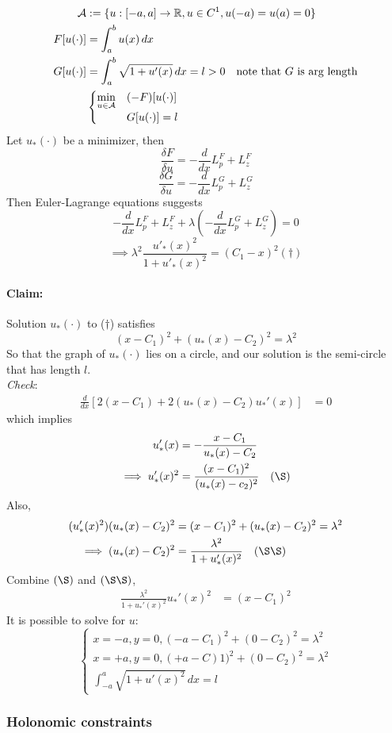 \documentclass[11pt]{article}
\begin{document}
	\example
	\begin{align}
		\mathcal{A} &:= \{u: [-a, a] \rightarrow \mathbb{R}, u \in C^1, u(-a) = u(a) = 0 \}\\
		F[u(\cdot)] &= \int_a^b u(x) \, dx \\
		G[u(\cdot)] &= \int_a^b \sqrt{1 + u'(x)} \, dx = l > 0 \quad\text{note that $G$ is arg length}\\
		&\begin{cases}
			\underset{u \in \mathcal{A}}{\min} &(-F)[u(\cdot)] \\
			&G[u(\cdot)] = l
		\end{cases}
	\end{align}
	Let $u_*(\cdot)$ be a minimizer, then
	$$\frac{\delta F}{\delta u} = - \frac{d}{dx}L_p^F + L_z^F$$
	$$\frac{\delta G}{\delta u} = - \frac{d}{dx}L_p^G + L_z^G$$
	Then Euler-Lagrange equations suggests
	$$- \frac{d}{dx}L_p^F + L_z^F + \lambda(- \frac{d}{dx}L_p^G + L_z^G) = 0$$
	$$\implies \lambda^2 \frac{u'_*(x)^2}{1 + u'_*(x)^2} = (C_1 - x)^2 (\dagger)$$
	\paragraph{Claim:} Solution $u_*(\cdot)$ to ($\dagger$) satisfies
	$$(x-C_1)^2 + (u_*(x) - C_2)^2 = \lambda^2$$
	So that the graph of $u_*(\cdot)$ lies on a circle, and our solution is the semi-circle that has length $l$.\\
	\emph{Check}: 
		\begin{align}
			\frac{d}{dx} \left[ 2(x - C_1) + 2(u_*(x) - C_2)u_*'(x) \right] &= 0
		\end{align}
		which implies
		\begin{align}
			u'_*(x) &= - \frac{x - C_1}{u_*(x) - C_2} \\
			\implies u'_*(x)^2 &= \frac{(x - C_1)^2}{(u_*(x) - c_2)^2}\quad (\S)
		\end{align}
		Also, 
		\begin{align}
			(u_*'(x)^2)(u_*(x) - C_2)^2  &= (x - C_1)^2 + (u_*(x) - C_2)^2 = \lambda^2 \\
			\implies (u_*(x) - C_2)^2 &= \frac{\lambda^2}{1 + u'_*(x)^2}\quad (\S \S)
		\end{align}
		Combine $(\S)$ and $(\S \S)$,
		\begin{align}
			\frac{\lambda^2}{1 + u_*'(x)^2} u_*'(x)^2 &= (x - C_1)^2
		\end{align}
	It is possible to solve for $u$:
	$$\begin{cases}
		x=-a, y=0, (-a-C_1)^2 + (0-C_2)^2 = \lambda^2 \\
		x=+a, y=0, (+a-C)1)^2 + (0-C_2)^2 = \lambda^2 \\
		\int_{-a}^a \sqrt{1 + u'(x)^2} \, dx = l
	\end{cases}$$
	\subsubsection{Holonomic constraints}
	
	
	
	
	
	
	
	
	
	
	
	
	
	
	
	
	
	
	
	
	
	
	
	
	
\end{document}
